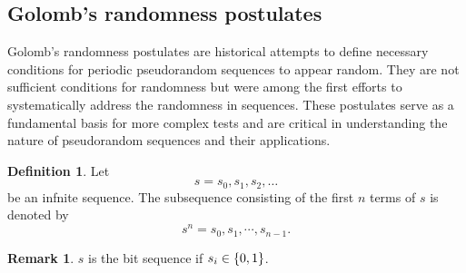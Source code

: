 \documentclass[12pt,openany]{book}
\theoremstyle{definition}
\newtheorem{definition}{Definition}[chapter]
\newtheorem{remark}{Remark}[chapter]
\begin{document}
\newpage
\subsection{Golomb’s randomness postulates}
Golomb’s randomness postulates are historical attempts to define necessary conditions for periodic pseudorandom sequences to appear random. They are not sufficient conditions for randomness but were among the first efforts to systematically address the randomness in sequences. These postulates serve as a fundamental basis for more complex tests and are critical in understanding the nature of pseudorandom sequences and their applications.

\begin{tcolorbox}[colback=white,colframe=defcolor,arc=5pt,title={\color{white}\bf }]
	\begin{definition}
		Let \[
		s=s_0,s_1,s_2,\dots
		\] be an infnite sequence. The subsequence consisting of the first $n$ terms of $s$ is denoted by \[
		s^n=s_0,s_1,\cdots,s_{n-1}.
		\]
	\end{definition}
\end{tcolorbox}
\begin{remark}
	$s$ is the bit sequence if $s_i\in\set{0,1}$.
\end{remark}
\end{document}
